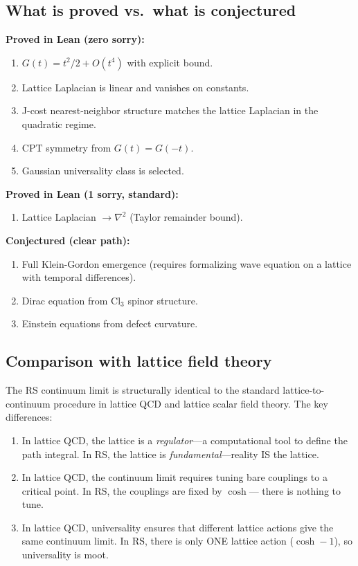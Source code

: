 \documentclass[11pt,a4paper]{article}
\theoremstyle{plain}
\theoremstyle{definition}
\theoremstyle{remark}
\newcommand{\Jlog}{G}
\begin{document}
\subsection{What is proved vs.\ what is conjectured}

\textbf{Proved in Lean (zero sorry):}
\begin{enumerate}[nosep]
\item $\Jlog(t) = t^2/2 + O(t^4)$ with explicit bound.
\item Lattice Laplacian is linear and vanishes on constants.
\item J-cost nearest-neighbor structure matches the lattice Laplacian
  in the quadratic regime.
\item CPT symmetry from $\Jlog(t) = \Jlog(-t)$.
\item Gaussian universality class is selected.
\end{enumerate}

\textbf{Proved in Lean (1 sorry, standard):}
\begin{enumerate}[nosep]
\item Lattice Laplacian $\to \nabla^2$ (Taylor remainder bound).
\end{enumerate}

\textbf{Conjectured (clear path):}
\begin{enumerate}[nosep]
\item Full Klein-Gordon emergence (requires formalizing wave equation
  on a lattice with temporal differences).
\item Dirac equation from Cl$_3$ spinor structure.
\item Einstein equations from defect curvature.
\end{enumerate}

\subsection{Comparison with lattice field theory}

The RS continuum limit is structurally identical to the standard
lattice-to-continuum procedure in lattice QCD and lattice scalar field
theory.  The key differences:
\begin{enumerate}[nosep]
\item In lattice QCD, the lattice is a \emph{regulator}---a
  computational tool to define the path integral.  In RS, the lattice
  is \emph{fundamental}---reality IS the lattice.
\item In lattice QCD, the continuum limit requires tuning bare couplings
  to a critical point.  In RS, the couplings are fixed by $\cosh$---
  there is nothing to tune.
\item In lattice QCD, universality ensures that different lattice actions
  give the same continuum limit.  In RS, there is only ONE lattice action
  ($\cosh - 1$), so universality is moot.
\end{enumerate}
\end{document}
